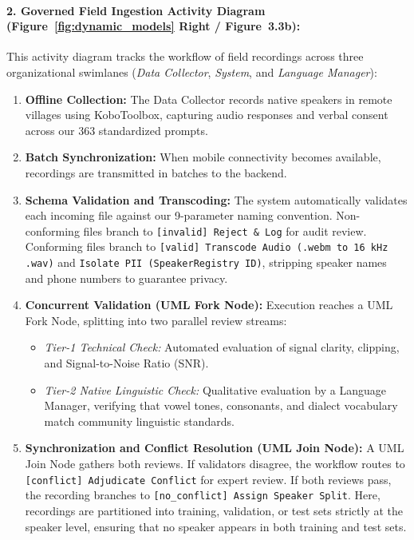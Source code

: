 \documentclass[conference]{IEEEtran}
\begin{document}
\paragraph{2. Governed Field Ingestion Activity Diagram (Figure~\ref{fig:dynamic_models} Right / Figure~3.3b):}
This activity diagram tracks the workflow of field recordings across three organizational swimlanes (\textit{Data Collector}, \textit{System}, and \textit{Language Manager}):
\begin{enumerate}
    \item \textbf{Offline Collection:} The Data Collector records native speakers in remote villages using KoboToolbox, capturing audio responses and verbal consent across our 363 standardized prompts.
    \item \textbf{Batch Synchronization:} When mobile connectivity becomes available, recordings are transmitted in batches to the backend.
    \item \textbf{Schema Validation and Transcoding:} The system automatically validates each incoming file against our 9-parameter naming convention. Non-conforming files branch to \texttt{[invalid] Reject \& Log} for audit review. Conforming files branch to \texttt{[valid] Transcode Audio (.webm to 16\,kHz .wav)} and \texttt{Isolate PII (SpeakerRegistry ID)}, stripping speaker names and phone numbers to guarantee privacy.
    \item \textbf{Concurrent Validation (UML Fork Node):} Execution reaches a UML Fork Node, splitting into two parallel review streams:
    \begin{itemize}
        \item \textit{Tier-1 Technical Check:} Automated evaluation of signal clarity, clipping, and Signal-to-Noise Ratio (SNR).
        \item \textit{Tier-2 Native Linguistic Check:} Qualitative evaluation by a Language Manager, verifying that vowel tones, consonants, and dialect vocabulary match community linguistic standards.
    \end{itemize}
    \item \textbf{Synchronization and Conflict Resolution (UML Join Node):} A UML Join Node gathers both reviews. If validators disagree, the workflow routes to \texttt{[conflict] Adjudicate Conflict} for expert review. If both reviews pass, the recording branches to \texttt{[no\_conflict] Assign Speaker Split}. Here, recordings are partitioned into training, validation, or test sets strictly at the speaker level, ensuring that no speaker appears in both training and test sets.
\end{enumerate}
\end{document}
